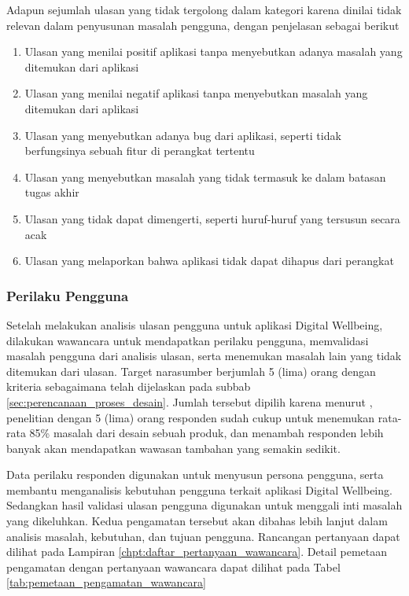 Adapun sejumlah ulasan yang tidak tergolong dalam kategori karena dinilai tidak relevan dalam penyusunan masalah pengguna, dengan penjelasan sebagai berikut

\begin{enumerate}
  \item Ulasan yang menilai positif aplikasi tanpa menyebutkan adanya masalah yang ditemukan dari aplikasi
  \item Ulasan yang menilai negatif aplikasi tanpa menyebutkan masalah yang ditemukan dari aplikasi
  \item Ulasan yang menyebutkan adanya bug dari aplikasi, seperti tidak berfungsinya sebuah fitur di perangkat tertentu
  \item Ulasan yang menyebutkan masalah yang tidak termasuk ke dalam batasan tugas akhir
  \item Ulasan yang tidak dapat dimengerti, seperti huruf-huruf yang tersusun secara acak 
  \item Ulasan yang melaporkan bahwa aplikasi tidak dapat dihapus dari perangkat
\end{enumerate}

\subsubsection{Perilaku Pengguna}
Setelah melakukan analisis ulasan pengguna untuk aplikasi Digital Wellbeing, dilakukan wawancara untuk mendapatkan perilaku pengguna, memvalidasi masalah pengguna dari analisis ulasan, serta menemukan masalah lain yang tidak ditemukan dari ulasan. Target narasumber berjumlah 5 (lima) orang dengan kriteria sebagaimana telah dijelaskan pada subbab \ref{sec:perencanaan_proses_desain}. Jumlah tersebut dipilih karena menurut \textcite{nielsenusabilityproblems}, penelitian dengan 5 (lima) orang responden sudah cukup untuk menemukan rata-rata 85\% masalah dari desain sebuah produk, dan menambah responden lebih banyak akan mendapatkan wawasan tambahan yang semakin sedikit.

 Data perilaku responden digunakan untuk menyusun persona pengguna, serta membantu menganalisis kebutuhan pengguna terkait aplikasi Digital Wellbeing. Sedangkan hasil validasi ulasan pengguna digunakan untuk  menggali inti masalah yang dikeluhkan. Kedua pengamatan tersebut akan dibahas lebih lanjut dalam analisis masalah, kebutuhan, dan tujuan pengguna. Rancangan pertanyaan dapat dilihat pada Lampiran \ref{chpt:daftar_pertanyaan_wawancara}. Detail pemetaan pengamatan dengan pertanyaan wawancara dapat dilihat pada Tabel \ref{tab:pemetaan_pengamatan_wawancara}


